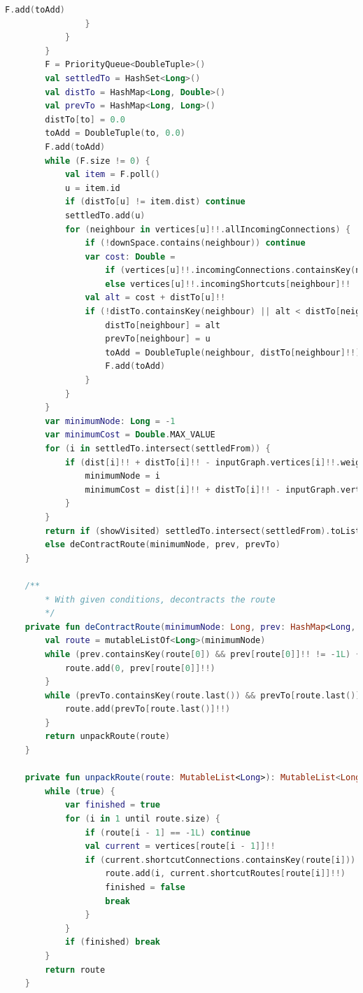 \documentclass[11pt,twoside,a4paper]{report}
\begin{document}
\begin{lstlisting}[language=kotlin]
                    F.add(toAdd)
                }
            }
        }
        F = PriorityQueue<DoubleTuple>()
        val settledTo = HashSet<Long>()
        val distTo = HashMap<Long, Double>()
        val prevTo = HashMap<Long, Long>()
        distTo[to] = 0.0
        toAdd = DoubleTuple(to, 0.0)
        F.add(toAdd)
        while (F.size != 0) {
            val item = F.poll()
            u = item.id
            if (distTo[u] != item.dist) continue
            settledTo.add(u)
            for (neighbour in vertices[u]!!.allIncomingConnections) {
                if (!downSpace.contains(neighbour)) continue
                var cost: Double =
                    if (vertices[u]!!.incomingConnections.containsKey(neighbour)) vertices[u]!!.incomingConnections[neighbour]!!
                    else vertices[u]!!.incomingShortcuts[neighbour]!!
                val alt = cost + distTo[u]!!
                if (!distTo.containsKey(neighbour) || alt < distTo[neighbour]!!) {
                    distTo[neighbour] = alt
                    prevTo[neighbour] = u
                    toAdd = DoubleTuple(neighbour, distTo[neighbour]!!)
                    F.add(toAdd)
                }
            }
        }
        var minimumNode: Long = -1
        var minimumCost = Double.MAX_VALUE
        for (i in settledTo.intersect(settledFrom)) {
            if (dist[i]!! + distTo[i]!! - inputGraph.vertices[i]!!.weight < minimumCost) {
                minimumNode = i
                minimumCost = dist[i]!! + distTo[i]!! - inputGraph.vertices[i]!!.weight
            }
        }
        return if (showVisited) settledTo.intersect(settledFrom).toList()
        else deContractRoute(minimumNode, prev, prevTo)
    }

    /**
        * With given conditions, decontracts the route
        */
    private fun deContractRoute(minimumNode: Long, prev: HashMap<Long, Long>, prevTo: HashMap<Long, Long>): List<Long> {
        val route = mutableListOf<Long>(minimumNode)
        while (prev.containsKey(route[0]) && prev[route[0]]!! != -1L) {
            route.add(0, prev[route[0]]!!)
        }
        while (prevTo.containsKey(route.last()) && prevTo[route.last()]!! != -1L) {
            route.add(prevTo[route.last()]!!)
        }
        return unpackRoute(route)
    }

    private fun unpackRoute(route: MutableList<Long>): MutableList<Long> {
        while (true) {
            var finished = true
            for (i in 1 until route.size) {
                if (route[i - 1] == -1L) continue
                val current = vertices[route[i - 1]]!!
                if (current.shortcutConnections.containsKey(route[i])) {
                    route.add(i, current.shortcutRoutes[route[i]]!!)
                    finished = false
                    break
                }
            }
            if (finished) break
        }
        return route
    }


\end{lstlisting}
\end{document}
